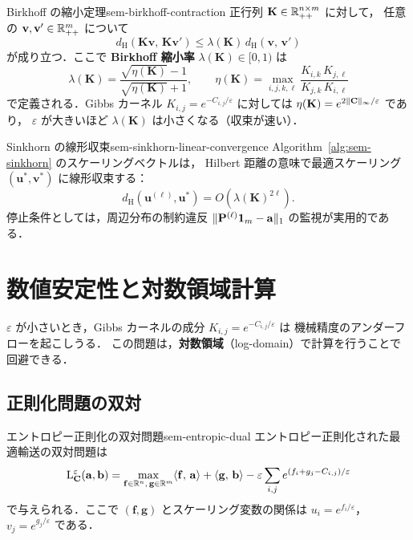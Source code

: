 \begin{theorem}{Birkhoff の縮小定理}{sem-birkhoff-contraction}
  正行列 $\mathbf{K} \in \mathbb{R}_{++}^{n \times m}$ に対して，
  任意の $\mathbf{v}, \mathbf{v}' \in \mathbb{R}_{++}^m$ について
  \[
    d_{\mathrm{H}}(\mathbf{K}\mathbf{v},\, \mathbf{K}\mathbf{v}')
    \leq \lambda(\mathbf{K}) \, d_{\mathrm{H}}(\mathbf{v},\, \mathbf{v}')
  \]
  が成り立つ．ここで \textbf{Birkhoff 縮小率}
  $\lambda(\mathbf{K}) \in [0, 1)$ は
  \[
    \lambda(\mathbf{K})
    = \frac{\sqrt{\eta(\mathbf{K})} - 1}{\sqrt{\eta(\mathbf{K})} + 1},
    \qquad
    \eta(\mathbf{K})
    = \max_{i,j,k,\ell}
    \frac{K_{i,k} \, K_{j,\ell}}{K_{j,k} \, K_{i,\ell}}
  \]
  で定義される．Gibbs カーネル $K_{i,j} = e^{-C_{i,j}/\varepsilon}$ に対しては
  $\eta(\mathbf{K}) = e^{2\lVert \mathbf{C} \rVert_\infty / \varepsilon}$ であり，
  $\varepsilon$ が大きいほど $\lambda(\mathbf{K})$ は小さくなる（収束が速い）．
\end{theorem}

\begin{proposition}{Sinkhorn の線形収束}{sem-sinkhorn-linear-convergence}
  Algorithm~\ref{alg:sem-sinkhorn} のスケーリングベクトルは，
  Hilbert 距離の意味で最適スケーリング $(\mathbf{u}^*, \mathbf{v}^*)$ に線形収束する：
  \[
    d_{\mathrm{H}}(\mathbf{u}^{(\ell)}, \mathbf{u}^*)
    = O(\lambda(\mathbf{K})^{2\ell}).
  \]
  停止条件としては，周辺分布の制約違反
  $\lVert \mathbf{P}^{(\ell)} \mathbf{1}_m - \mathbf{a} \rVert_1$ の監視が実用的である．
\end{proposition}

\section{数値安定性と対数領域計算}
\label{sec:sem-log-domain}

$\varepsilon$ が小さいとき，Gibbs カーネルの成分 $K_{i,j} = e^{-C_{i,j}/\varepsilon}$ は
機械精度のアンダーフローを起こしうる．
この問題は，\textbf{対数領域}（log-domain）で計算を行うことで回避できる．

\subsection{正則化問題の双対}

\begin{proposition}{エントロピー正則化の双対問題}{sem-entropic-dual}
  エントロピー正則化された最適輸送の双対問題は
  \[
    \mathrm{L}_{\mathbf{C}}^\varepsilon(\mathbf{a}, \mathbf{b})
    = \max_{\mathbf{f} \in \mathbb{R}^n,\, \mathbf{g} \in \mathbb{R}^m}
    \langle \mathbf{f},\, \mathbf{a} \rangle + \langle \mathbf{g},\, \mathbf{b} \rangle
    - \varepsilon \sum_{i,j} e^{(f_i + g_j - C_{i,j})/\varepsilon}
  \]
  で与えられる．ここで $(\mathbf{f}, \mathbf{g})$ とスケーリング変数の関係は
  $u_i = e^{f_i/\varepsilon}$，$v_j = e^{g_j/\varepsilon}$ である．
\end{proposition}


